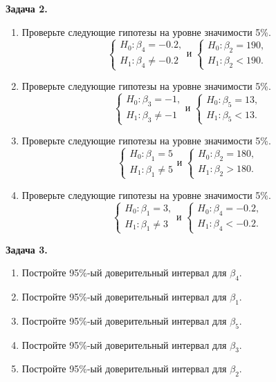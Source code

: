 \documentclass[10pt, a4paper]{extarticle}
\begin{document}
	{\Large \textbf{Задача 2.}}
	\begin{enumerate}[label=\alph*)]
			\item Проверьте следующие гипотезы на уровне значимости 5\%.
		\[
		\begin{cases}
			H_0: \beta_4 = -0.2, \\
			H_1: \beta_4 \ne -0.2
		\end{cases}\text{и } 
		\begin{cases}
			H_0: \beta_2 = 190, \\
			H_1: \beta_2 < 190.
		\end{cases}
		\]
		\item Проверьте следующие гипотезы на уровне значимости 5\%.
		\[
		\begin{cases}
			H_0: \beta_3 = -1, \\
			H_1: \beta_3 \ne -1
		\end{cases}\text{и } 
		\begin{cases}
			H_0: \beta_5 = 13, \\
			H_1: \beta_5 < 13.
		\end{cases}
		\]
		\item Проверьте следующие гипотезы на уровне значимости 5\%.
		\[
		\begin{cases}
			H_0: \beta_1 = 5 \\
			H_1: \beta_1 \ne 5
		\end{cases}\text{и } 
		\begin{cases}
			H_0: \beta_2 = 180, \\
			H_1: \beta_2 > 180.
		\end{cases}
		\]
		\item Проверьте следующие гипотезы на уровне значимости 5\%.
		\[
		\begin{cases}
			H_0: \beta_1 = 3, \\
			H_1: \beta_1 \ne 3
		\end{cases}\text{и } 
		\begin{cases}
			H_0: \beta_4 = -0.2, \\
			H_1: \beta_4 < -0.2.
		\end{cases}
		\]
	\end{enumerate}
	\vspace{1em}

	{\Large \textbf{Задача 3.}}
	\begin{enumerate}[label=\alph*)]
		\item Постройте 95\%-ый доверительный интервал для $\beta_4$.
		\item Постройте 95\%-ый доверительный интервал для $\beta_1$.
		\item Постройте 95\%-ый доверительный интервал для $\beta_5$.
		\item Постройте 95\%-ый доверительный интервал для $\beta_3$.
		\item Постройте 95\%-ый доверительный интервал для $\beta_2$.
	\end{enumerate}
\end{document}
